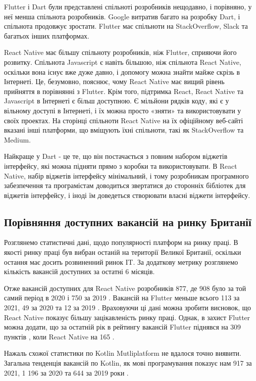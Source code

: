 Flutter і Dart були представлені спільноті розробників нещодавно, і порівняно, у неї менша спільнота розробників.
Google витратив багато на розробку Dart, і спільнота продовжує зростати.
Flutter має спільноти на StackOverflow, Slack та багатьох інших платформах.

React Native має більшу спільноту розробників, ніж Flutter, сприяючи його розвитку.
Спільнота Javascript є навіть більшою, ніж спільнота React Native, оскільки вона існує вже дуже давно, і допомогу можна знайти майже скрізь в Інтернеті.
Це, безумовно, пояснює, чому React Native має вищий рівень прийняття в порівнянні з Flutter.
Крім того, підтримка React, React Native та Javascript в Інтернеті є більш доступною.
Є мільйони рядків коду, які є у вільному доступі в Інтернеті, і їх можна просто «зняти» та використовувати у своїх проектах.
На сторінці спільноти React Native на їх офіційному веб-сайті вказані інші платформи, що вміщують їхні спільноти, такі як StackOverflow та Medium.

Найкраще у Dart - це те, що він постачається з повним набором віджетів інтерфейсу, які можна підняти прямо з коробки та використовувати.
В React Native, набір віджетів інтерфейсу мінімальний, і тому розробникам програмного забезпечення та програмістам доводиться звертатися до сторонніх бібліотек для віджетів інтерфейсу, і іноді їм доведеться створювати власні віджети інтерфейсу.

\subsection{Порівняння доступних вакансій на ринку Британії}
\label{subsec:market_comparisson}
Розглянемо статистичні дані, щодо популярності платформ на ринку праці.
В якості ринку праці був вибран останій на території Великої Британії, оскільки остання має досить розвиненний ринок IT.
За додаткову метрику розглянемо кількість вакансій доступних за остатні 6 місяців.

Отже вакансій доступних для React Native розробників 877, де 908 було за той самий період в 2020 і 750 за 2019 \cite{react_native_jobs}.
Вакансій на Flutter меньше всього 113 за 2021, 49 за 2020 та 12 за 2019 \cite{flutter_jobs}.
Враховуючи ці дані можна зробити висновок, що React Native показує більшу зацікавленість ринку праці.
Однак, в захист Flutter можна додати, що за остатній рік в рейтингу вакансій Flutter піднявся на 309 пунктів \cite{flutter_jobs}, коли React Native на 165 \cite{react_native_jobs}.

Нажаль схожої статистики по Kotlin Mutliplatform не вдалося точно виявити.
Загальна тенденція вакансій по Kotlin, як мові програмування показує нам 917 за 2021, 1 196 за 2020 та 644 за 2019 роки \cite{kotlin_jobs}.

